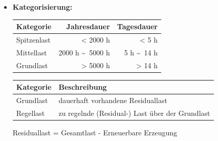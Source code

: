 {\begin{itemize}
        \item \textbf{Kategorisierung:} 
            \begin{table}[H]
                \centering 
                \small
                \begin{tabular}{l r r}
                    \toprule
                    Kategorie & Jahresdauer & Tagesdauer \\
                    \midrule
                    Spitzenlast & < 2000 h & < 5 h\\
                    Mittellast & 2000 h \textasciitilde \ 5000 h & 5 h \textasciitilde \ 14 h\\
                    Grundlast & > 5000 h & > 14 h\\
                    \bottomrule
                \end{tabular}
            \end{table}

            \begin{table}[H]
                \centering
                \small
                \begin{tabularx}{\columnwidth}{l X}
                    \toprule
                    Kategorie & Beschreibung \\
                    \midrule
                    Grundlast & dauerhaft vorhandene Residuallast \\
                    Regellast & zu regelnde (Residual-) Last über der Grundlast\\
                    \bottomrule
                \end{tabularx}
            \end{table}
            Residuallast = Gesamtlast - Erneuerbare Erzeugung

        \end{itemize}
    }